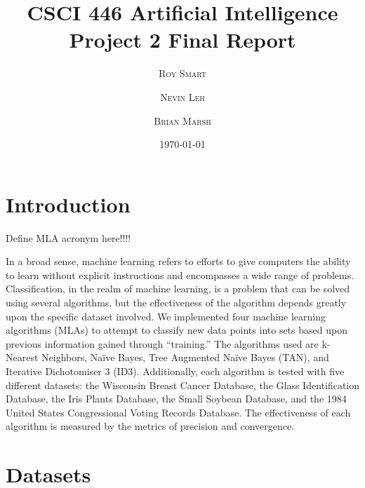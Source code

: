 \documentclass{article}
\title{\vspace{-15mm}\fontsize{24pt}{10pt}\selectfont\textbf{CSCI 446 Artificial Intelligence \\ Project 2 Final Report} \\[-2mm]} %
\date{\today}
\author{
\large
\textsc{Roy Smart} \and \textsc{Nevin Leh} \and \textsc{Brian Marsh}\\[2mm] %
}
\begin{document}
\maketitle %

\thispagestyle{fancy} %



\normalsize

\begin{abstract}
	
\end{abstract}
\section{Introduction}


Define MLA acronym here!!!!

	In a broad sense, machine learning refers to efforts to give computers the ability to learn without explicit instructions and encompasses a wide range of problems.  Classification, in the realm of machine learning, is a problem that can be solved using several algorithms, but the effectiveness of the algorithm depends greatly upon the specific dataset involved.  We implemented four machine learning algorithms (MLAs) to attempt to classify new data points into sets based upon previous information gained through “training.”  The algorithms used are k-Nearest Neighbors, Naïve Bayes, Tree Augmented Naïve Bayes (TAN), and Iterative Dichotomiser 3 (ID3).  Additionally, each algorithm is tested with five different datasets: the Wisconsin Breast Cancer Database, the Glass Identification Database, the Iris Plants Database, the Small Soybean Database, and the 1984 United States Congressional Voting Records Database.  The effectiveness of each algorithm is measured by the metrics of precision and convergence.  

\section{Datasets}
\end{document}
